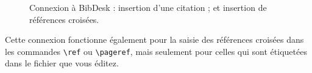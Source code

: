 \documentclass[11pt,french]{article}
\newcommand{\TS}{\textsf{\TeX Shop}}
\newcommand{\cmd}[1]{\textsf{#1}}
\newcommand{\mnu}[1]{\textsf{#1}}
\newcommand{\To}{\,\(\to\)\,}
\begin{document}
%
\begin{figure}
\centering
{}%
\hfill%
%
\caption[BibDesk Plugin Use.]{
Connexion à \textsf{BibDesk} :  insertion d'une citation ; et
 insertion de références croisées.}
\label{bibdesk}
\end{figure}

Cette connexion fonctionne également pour la saisie des références croisées dans les commandes \verb|\ref| ou \verb|\pageref|, mais seulement pour celles qui sont étiquetées dans le fichier que vous éditez.
\end{document}
